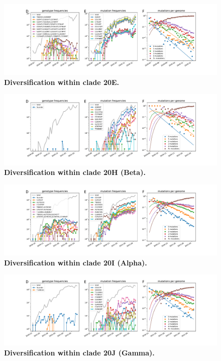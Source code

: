 \begin{figure}[h]
    \includegraphics[width=\textwidth]{figures/counts/20E_counts.pdf}
    \caption{{\bf Diversification within clade 20E.}
    \label{fig:20E_counts}}
\end{figure}

\begin{figure}[h]
    \includegraphics[width=\textwidth]{figures/counts/20H_counts.pdf}
    \caption{{\bf Diversification within clade 20H (Beta).}
    \label{fig:20H_counts}}
\end{figure}

\begin{figure}[h]
    \includegraphics[width=\textwidth]{figures/counts/20I_counts.pdf}
    \caption{{\bf Diversification within clade 20I (Alpha).}
    \label{fig:20I_counts}}
\end{figure}

\begin{figure}[h]
    \includegraphics[width=\textwidth]{figures/counts/20J_counts.pdf}
    \caption{{\bf Diversification within clade 20J (Gamma).}
    \label{fig:20J_counts}}
\end{figure}


